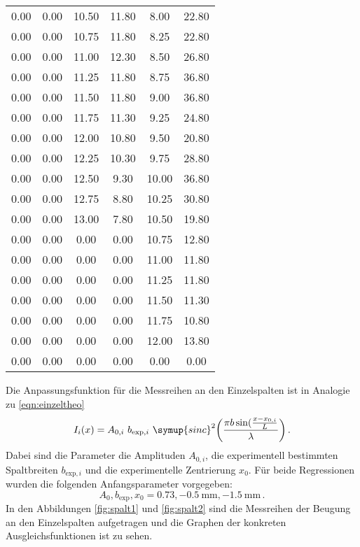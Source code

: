 \begin{longtable}{S[table-format=3.2] S[table-format=3.2] S[table-format=3.2] S[table-format=3.2] S[table-format=3.2] S[table-format=3.2]}
                0.00 & 0.00 & 10.50 & 11.80 & 8.00 & 22.80\\
                0.00 & 0.00 & 10.75 & 11.80 & 8.25 & 22.80\\
                0.00 & 0.00 & 11.00 & 12.30 & 8.50 & 26.80\\
                0.00 & 0.00 & 11.25 & 11.80 & 8.75 & 36.80\\
                0.00 & 0.00 & 11.50 & 11.80 & 9.00 & 36.80\\
                0.00 & 0.00 & 11.75 & 11.30 & 9.25 & 24.80\\
                0.00 & 0.00 & 12.00 & 10.80 & 9.50 & 20.80\\
                0.00 & 0.00 & 12.25 & 10.30 & 9.75 & 28.80\\
                0.00 & 0.00 & 12.50 & 9.30 & 10.00 & 36.80\\
                0.00 & 0.00 & 12.75 & 8.80 & 10.25 & 30.80\\
                0.00 & 0.00 & 13.00 & 7.80 & 10.50 & 19.80\\
                0.00 & 0.00 & 0.00 & 0.00 & 10.75 & 12.80\\
                0.00 & 0.00 & 0.00 & 0.00 & 11.00 & 11.80\\
                0.00 & 0.00 & 0.00 & 0.00 & 11.25 & 11.80\\
                0.00 & 0.00 & 0.00 & 0.00 & 11.50 & 11.30\\
                0.00 & 0.00 & 0.00 & 0.00 & 11.75 & 10.80\\
                0.00 & 0.00 & 0.00 & 0.00 & 12.00 & 13.80\\
                0.00 & 0.00 & 0.00 & 0.00 & 0.00 & 0.00\\
                \bottomrule
\end{longtable}

Die Anpassungsfunktion für die Messreihen an den Einzelspalten ist in Analogie zu
\eqref{eqn:einzeltheo}
\begin{equation}
  I_i (x) = A_{0,i} \,\, b_{\text{exp},i} \,\, \symup{sinc}^2\biggl(\frac{\pi b \sin(\frac{x-x_{0,i}}{L}}{\lambda}\biggr) \,.
\end{equation}
Dabei sind die Parameter die Amplituden $A_{0,i}$, die experimentell bestimmten Spaltbreiten
$b_{\text{exp},i}$ und die experimentelle Zentrierung $x_0$.
Für beide Regressionen wurden die folgenden Anfangsparameter vorgegeben:
\begin{equation}
  {A_0, b_{\text{exp}}, x_0} = {0.73, \SI{-0.5}{\milli\meter}, \SI{-1.5}{\milli\meter}}\,.
\end{equation}
In den Abbildungen \ref{fig:spalt1} und \ref{fig:spalt2} sind die Messreihen der Beugung an den Einzelspalten aufgetragen
und die Graphen der konkreten Ausgleichsfunktionen ist zu sehen.

